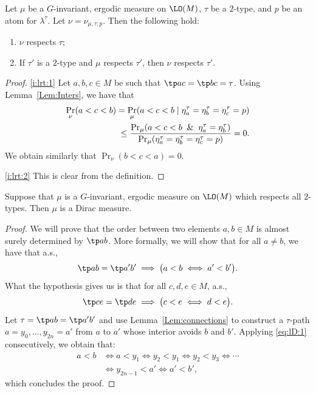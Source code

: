 \begin{lemma}
\label{l:respecting-types}
Let $\mu$ be a $G$-invariant, ergodic measure on $\LO(M)$, $\tau$ be a $2$-type, and $p$ be an atom for $\lambda^\tau$. Let $\nu = \nu_{\mu, \tau, p}$. Then the following hold:
\begin{enumerate}
\item \label{i:lrt:1} $\nu$ respects $\tau$;
\item \label{i:lrt:2} If $\tau'$ is a $2$-type and $\mu$ respects $\tau'$, then $\nu$ respects $\tau'$.
\end{enumerate}
\end{lemma}
\skpt
\begin{proof}
\eqref{i:lrt:1} Let $a, b, c \in M$ be such that $\tp ac = \tp bc = \tau$. Using Lemma~\ref{Lem:Inters}, we have that
\begin{equation*}
\begin{split}
\Pr_\nu(a < c < b) = \Pr_\mu(a < c < b \mid \eta^\tau_a = \eta^\tau_b = \eta^\tau_c = p) \\
\leq \frac{\Pr_\mu(a < c < b \And \eta^\tau_a = \eta^\tau_b)}{\Pr_\mu(\eta^\tau_a = \eta^\tau_b = \eta^\tau_c = p)} = 0.
\end{split}
\end{equation*}
We obtain similarly that $\Pr_\nu(b < c < a) = 0$.

\eqref{i:lrt:2} This is clear from the definition.
\end{proof}

\begin{lemma}
\label{l:Dirac}
Suppose that $\mu$ is a $G$-invariant, ergodic measure on $\LO(M)$ which respects all $2$-types. Then $\mu$ is a Dirac measure.
\end{lemma}
\begin{proof}
We will prove that the order between two elements $a, b \in M$ is almost surely determined by $\tp ab$. More formally, we will show that for all $a \neq b$, we have that a.s.,\vspace*{-3pt}
\begin{equation*}
\tp ab = \tp a'b' \implies \big(a < b \iff a' < b' \big).
\end{equation*}
What the hypothesis gives us is that for all $c, d, e \in M$, a.s.,\vspace*{-3pt}
\begin{equation}
\label{eq:lD:1}
\tp ce = \tp de \implies \big(c < e \iff d < e \big).
\end{equation}
Let $\tau = \tp ab = \tp a'b'$ and use Lemma~\ref{Lem:connections} to construct a $\tau$-path $a = y_0, \ldots, y_{2n} = a'$ from $a$ to $a'$ whose interior avoids $b$ and $b'$. Applying \eqref{eq:lD:1} consecutively, we obtain that:\vspace*{-7pt}\enlargethispage{.8\baselineskip}%
\begin{equation*}
\begin{split}
a < b &\iff a < y_1 \iff y_2 < y_1 \iff y_2 < y_3 \iff \cdots \\
&\iff y_{2n-1} < a' \iff a' < b',
\end{split}
\end{equation*}
which concludes the proof.
\end{proof}

